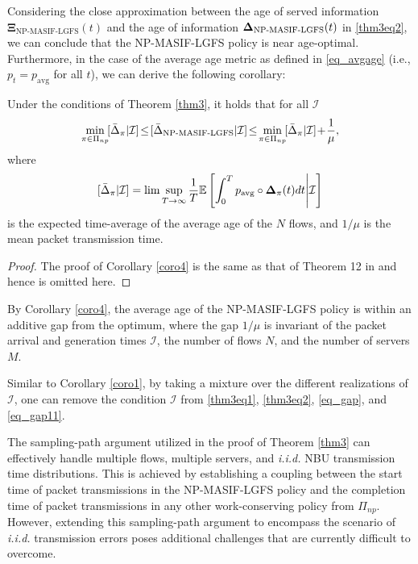 


Considering the close approximation between the age of served information $\bm{\Xi}_{\text{NP-MASIF-LGFS}}(t)$ and the age of information $\bm{\Delta}_{\text{NP-MASIF-LGFS}}(t)$ in \eqref{thm3eq2}, we can conclude that the NP-MASIF-LGFS policy is near age-optimal.
Furthermore, in the case of the average age metric as defined in \eqref{eq_avgage} (i.e., $p_t = p_{\text{avg}} $ for all $t$), we can derive the following corollary: 
\begin{corollary}\label{coro4}
Under the conditions of Theorem \ref{thm3}, it holds that for all $\mathcal{I}$
\begin{align}\label{eq_gap}
\min_{\pi\in\Pi_{np}}\! [\bar{\age}_{ \pi}|\mathcal{I}] \!\leq\! [\bar{\age}_{\text{NP-MASIF-LGFS}}|\mathcal{I}]\!\leq\! \min_{\pi\in\Pi_{np}}\! [\bar{\age}_{ \pi}|\mathcal{I}] \!+\! \frac{1}{\mu},
\end{align}
where 
\begin{align}\label{eq_gap11}
[\bar{\Delta}_{ \pi}|\mathcal{I}] = \lim\sup_{T\rightarrow \infty} \frac{1}{T} \mathbb{E}\left[\int_0^T p_{\text{avg}} \circ\bm{\Delta}_\pi (t) dt \Bigg| \mathcal{I}\right]
\end{align} is the expected time-average of the average age of the $N$ flows, and $1/\mu$ is the mean packet transmission time.
\end{corollary}


\begin{proof}
The proof of Corollary \ref{coro4} is the same as that of Theorem 12 in \cite{BedewyJournal2017} and hence is omitted here. 
\end{proof}

By Corollary \ref{coro4}, the  average age of the NP-MASIF-LGFS policy is within an additive gap from the optimum, where the gap $1/\mu$ is invariant of the packet arrival and generation times $\mathcal{I}$, the number of flows $N$, and the number of servers $M$. 

Similar to Corollary \ref{coro1}, by taking a mixture over the different realizations of $\mathcal{I}$, one can remove the condition $\mathcal{I}$ from \eqref{thm3eq1}, \eqref{thm3eq2}, \eqref{eq_gap}, and \eqref{eq_gap11}.


The sampling-path argument utilized in the proof of Theorem \ref{thm3} can effectively handle multiple flows,  multiple servers, and \emph{i.i.d.} NBU transmission time distributions. This is achieved by establishing a coupling between the start time of packet transmissions in the NP-MASIF-LGFS policy and the completion time of packet transmissions in any other work-conserving policy from $\Pi_{np}$. However, extending this sampling-path argument to encompass the scenario of \emph{i.i.d.} transmission errors poses additional challenges that are currently difficult to overcome. 



